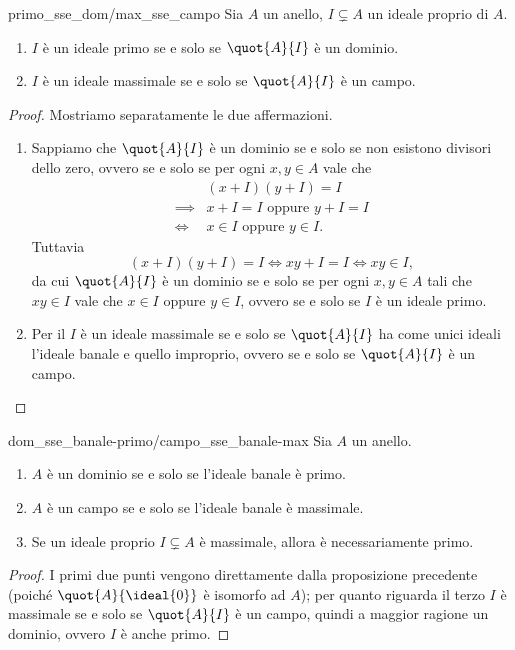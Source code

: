 \begin{proposition}{}
    {primo_sse_dom/max_sse_campo}
    Sia $A$ un anello, $I \subsetneq A$ un ideale proprio di $A$.
    \begin{enumerate}[label={(\arabic*)}]
        \item $I$ è un ideale primo se e solo se $\quot{A}{I}$ è un dominio.
        \item $I$ è un ideale massimale se e solo se $\quot{A}{I}$ è un campo.
    \end{enumerate}
\end{proposition}
\begin{proof}
    Mostriamo separatamente le due affermazioni.
    \begin{enumerate}[label={(\arabic*)}]
        \item Sappiamo che $\quot{A}{I}$ è un dominio se e solo se non esistono divisori dello zero, ovvero se e solo se per ogni $x, y \in A$ vale che \begin{align*}
            &(x + I)(y + I) = I \\
            \implies &x + I = I \text{ oppure } y + I = I \\
            \iff &x \in I \text{ oppure } y \in I. 
        \end{align*} Tuttavia \[
            (x + I)(y + I) = I \iff xy + I = I \iff xy \in I,   
        \] da cui $\quot{A}{I}$ è un dominio se e solo se per ogni $x, y \in A$ tali che $xy \in I$ vale che $x \in I$ oppure $y \in I$, ovvero se e solo se $I$ è un ideale primo.
        \item Per il  $I$ è un ideale massimale se e solo se $\quot{A}{I}$ ha come unici ideali l'ideale banale e quello improprio, ovvero se e solo se $\quot{A}{I}$ è un campo. \qedhere
    \end{enumerate}
\end{proof}

\begin{corollary}{}
    {dom_sse_banale-primo/campo_sse_banale-max}
    Sia $A$ un anello. \begin{enumerate}
        \item $A$ è un dominio se e solo se l'ideale banale è primo.
        \item $A$ è un campo se e solo se l'ideale banale è massimale.
        \item Se un ideale proprio $I \subsetneq A$ è massimale, allora è necessariamente primo.
    \end{enumerate}
\end{corollary}
\begin{proof}
    I primi due punti vengono direttamente dalla proposizione precedente (poiché $\quot{A}{\ideal{0}}$ è isomorfo ad $A$); per quanto riguarda il terzo $I$ è massimale se e solo se $\quot{A}{I}$ è un campo, quindi a maggior ragione un dominio, ovvero $I$ è anche primo.
\end{proof}

